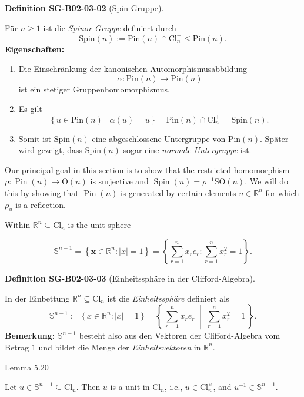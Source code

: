 \documentclass[10pt, letterpaper]{article}
\newcommand{\R}{\mathbb{R}}
\newcommand{\Cl}{\mathrm{Cl}}
\newcommand{\Spin}{\mathrm{Spin}}
\newcommand{\Pin}{\mathrm{Pin}}
\newcommand{\CustomHeading}[3]{%
  \par\medskip\noindent%
  \textbf{#1 #2} \textnormal{(#3)}.\enskip%
}
\newenvironment{DEF}[2]{\begin{unitbox}\CustomHeading{Definition}{#1}{#2}}{\end{unitbox}}
\begin{document}
\begin{DEF}{SG-B02-03-02}{Spin Gruppe}
Für \(n \ge 1\) ist die \emph{Spinor-Gruppe} definiert durch
\[
\Spin(n) := \Pin(n) \cap \Cl_n^{+} \le \Pin(n).
\]
\textbf{Eigenschaften:}
\begin{enumerate}[label=(\roman*)]
\item Die Einschränkung der kanonischen Automorphismusabbildung
\[
\alpha : \Pin(n) \longrightarrow \Pin(n)
\]
ist ein stetiger Gruppenhomomorphismus.

\item Es gilt
\[
\{\,u \in \Pin(n) \mid \alpha(u) = u\,\} 
= \Pin(n) \cap \Cl_n^{+} = \Spin(n).
\]
\item Somit ist \(\Spin(n)\) eine abgeschlossene Untergruppe von \(\Pin(n)\).
Später wird gezeigt, dass \(\Spin(n)\) sogar eine \emph{normale Untergruppe} ist.
\end{enumerate}
\end{DEF}


Our principal goal in this section is to show that the restricted homomorphism $\rho: \operatorname{Pin}(n) \longrightarrow \mathrm{O}(n)$ is surjective and $\operatorname{Spin}(n)=\rho^{-1} \mathrm{SO}(n)$. We will do this by showing that $\operatorname{Pin}(n)$ is generated by certain elements $u \in \mathbb{R}^{n}$ for which $\rho_{u}$ is a reflection.

Within $\mathbb{R}^{n} \subseteq \mathrm{Cl}_{n}$ is the unit sphere

$$
\mathbb{S}^{n-1}=\left\{\mathbf{x} \in \mathbb{R}^{n}:|x|=1\right\}=\left\{\sum_{r=1}^{n} x_{r} e_{r}: \sum_{r=1}^{n} x_{r}^{2}=1\right\} .
$$



\begin{DEF}{SG-B02-03-03}{Einheitssphäre in der Clifford-Algebra}
In der Einbettung \(\R^n \subseteq \Cl_n\) ist die \emph{Einheitssphäre} definiert als
\[
\mathbb{S}^{n-1}
:= \{\,x \in \R^n : |x| = 1\,\}
= \left\{\,\sum_{r=1}^{n} x_r e_r \;\middle|\; \sum_{r=1}^{n} x_r^2 = 1\,\right\}.
\]
\textbf{Bemerkung:}
\(\mathbb{S}^{n-1}\) besteht also aus den Vektoren der Clifford-Algebra vom Betrag \(1\)
und bildet die Menge der \emph{Einheitsvektoren} in \(\R^n\).
\end{DEF}






Lemma 5.20


Let $u \in \mathbb{S}^{n-1} \subseteq \mathrm{Cl}_{n}$. Then $u$ is a unit in $\mathrm{Cl}_{n}$, i.e., $u \in \mathrm{Cl}_{n}^{\times}$, and $u^{-1} \in \mathbb{S}^{n-1}$.
\end{document}
